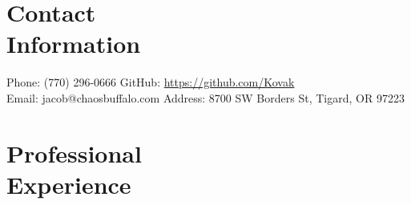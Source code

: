\documentclass[margin,line]{resume}
\begin{document}
\begin{resume}
    \section{\mysidestyle Contact\\Information}

    Phone: (770) 296-0666       \hfill GitHub: \url{https://github.com/Kovak} \\
    \noindent Email: jacob@chaosbuffalo.com  \hfill Address: 8700 SW Borders St, Tigard, OR 97223 \vspace{0mm}\\\vspace{-4.5mm}

    \section{\mysidestyle Professional\\Experience}


\end{resume}
\end{document}
